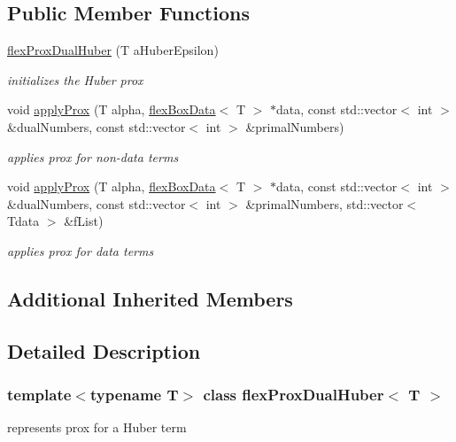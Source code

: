 \subsection*{Public Member Functions}
\begin{DoxyCompactItemize}
\item 
\hyperlink{classflex_prox_dual_huber_a4ab9fe05ffc64193bb7150cad6525610}{flex\+Prox\+Dual\+Huber} (T a\+Huber\+Epsilon)
\begin{DoxyCompactList}\small\item\em initializes the Huber prox \end{DoxyCompactList}\item 
void \hyperlink{classflex_prox_dual_huber_af1e80a4361cda51e2b51aceeb69c6b79}{apply\+Prox} (T alpha, \hyperlink{classflex_box_data}{flex\+Box\+Data}$<$ T $>$ $\ast$data, const std\+::vector$<$ int $>$ \&dual\+Numbers, const std\+::vector$<$ int $>$ \&primal\+Numbers)
\begin{DoxyCompactList}\small\item\em applies prox for non-\/data terms \end{DoxyCompactList}\item 
void \hyperlink{classflex_prox_dual_huber_a4ce1a386510236fb80213dec59430ac4}{apply\+Prox} (T alpha, \hyperlink{classflex_box_data}{flex\+Box\+Data}$<$ T $>$ $\ast$data, const std\+::vector$<$ int $>$ \&dual\+Numbers, const std\+::vector$<$ int $>$ \&primal\+Numbers, std\+::vector$<$ Tdata $>$ \&f\+List)
\begin{DoxyCompactList}\small\item\em applies prox for data terms \end{DoxyCompactList}\end{DoxyCompactItemize}
\subsection*{Additional Inherited Members}


\subsection{Detailed Description}
\subsubsection*{template$<$typename T$>$\newline
class flex\+Prox\+Dual\+Huber$<$ T $>$}

represents prox for a Huber term 

